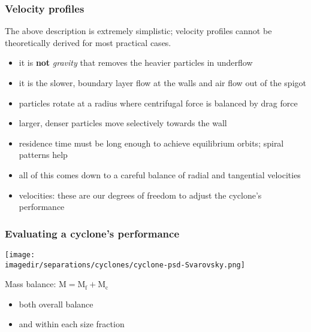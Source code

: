 \begin{frame}\frametitle{Velocity profiles}
	\begin{exampleblock}{}
		The above description is extremely simplistic; velocity profiles cannot be theoretically derived for most practical cases.
	\end{exampleblock}

	\begin{itemize}
		\item	it is \textbf{not} \emph{gravity} that removes the heavier particles in underflow
		\item	it is the slower, boundary layer flow at the walls and air flow out of the spigot
		\item	particles rotate at a radius where centrifugal force is balanced by drag force
		\item	larger, denser particles move selectively towards the wall
		\item	residence time must be long enough to achieve equilibrium orbits; spiral patterns help
		\item	all of this comes down to a careful balance of radial and tangential velocities
		\item	velocities: these are our degrees of freedom to adjust the cyclone's performance
	\end{itemize}
\end{frame}

\begin{frame}\frametitle{Evaluating a cyclone's performance}
	\begin{center}
		\texttt{[image: \\imagedir/separations/cyclones/cyclone-psd-Svarovsky.png]}
	\end{center}

	\vspace{-64pt}
	Mass balance: $\text{M} = \text{M}_\text{f} + \text{M}_\text{c}$
	\begin{itemize}
		\item	both overall balance
		\item	and within each size fraction
	\end{itemize}
	
	\vfill
\end{frame}


